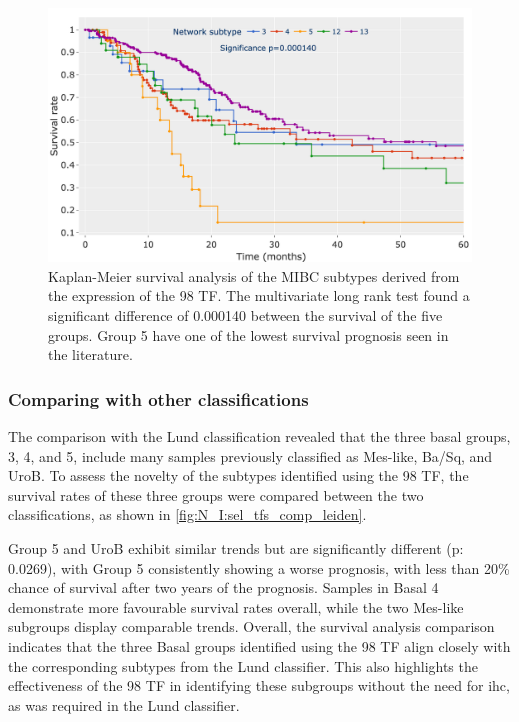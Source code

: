 \begin{figure}[!t]
    \centering
    \includegraphics[width=1.0\textwidth,keepaspectratio]{Sections/Network_I/Resources/selective_pruning/sel_tfs/survival_sel_tfs_cs.png}
    \caption[Survival analysis of the five MIBC groups found using the 98 TF]{Kaplan-Meier survival analysis of the MIBC subtypes derived from the expression of the 98 TF. The multivariate long rank test found a significant difference of 0.000140 between the survival of the five groups. Group 5 have one of the lowest survival prognosis seen in the literature. }
    \label{fig:N_I:sel_tfs_survival}
\end{figure} 


\subsubsection*{Comparing with other classifications} \label{s:N_I:sel_tfs_comp_survival}

The comparison with the Lund classification \citep{Marzouka2018-ge} revealed that the three basal groups, 3, 4, and 5, include many samples previously classified as Mes-like, Ba/Sq, and UroB. To assess the novelty of the subtypes identified using the 98 TF, the survival rates of these three groups were compared between the two classifications, as shown in \cref{fig:N_I:sel_tfs_comp_leiden}.

Group 5 and UroB exhibit similar trends but are significantly different (p: 0.0269), with Group 5 consistently showing a worse prognosis, with less than 20\% chance of survival after two years of the prognosis. Samples in Basal 4 demonstrate more favourable survival rates overall, while the two Mes-like subgroups display comparable trends. Overall, the survival analysis comparison indicates that the three Basal groups identified using the 98 TF align closely with the corresponding subtypes from the Lund classifier. This also highlights the effectiveness of the 98 TF in identifying these subgroups without the need for \acrlong{ihc}, as was required in the Lund classifier.

